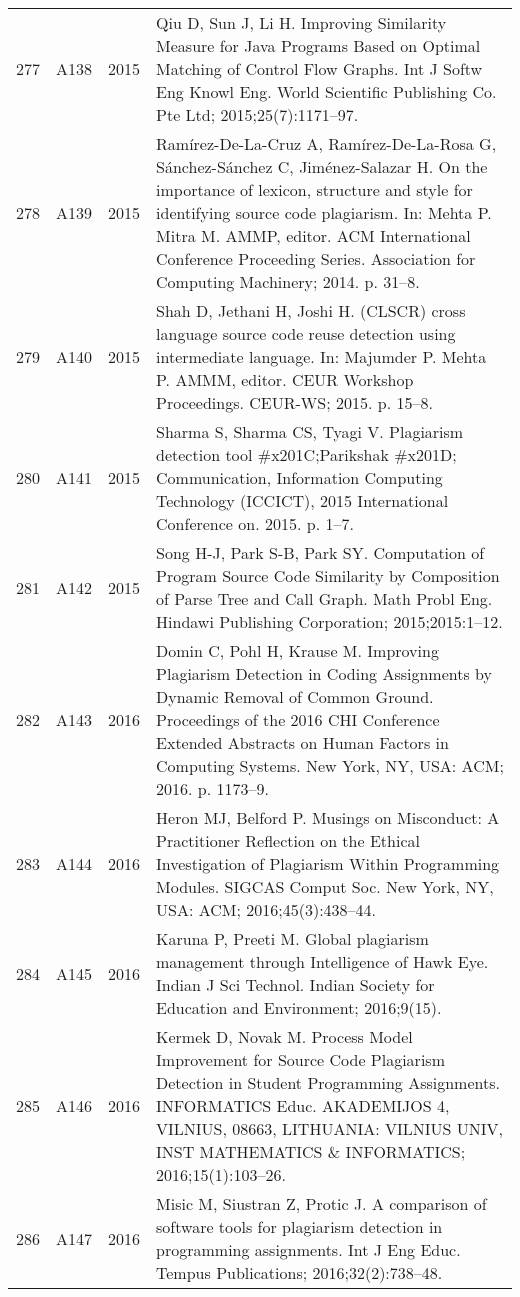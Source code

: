 \documentclass{article}\usepackage[]{graphicx}\usepackage[]{color}
\begin{document}
\begin{longtable}{l|L{1cm}|L{1cm}|L{12cm}|}
  277 & A138 & 2015 & Qiu D, Sun J, Li H. Improving Similarity Measure for Java Programs Based on Optimal Matching of Control Flow Graphs. Int J Softw Eng Knowl Eng. World Scientific Publishing Co. Pte Ltd; 2015;25(7):1171–97. \\ 
  278 & A139 & 2015 & Ramírez-De-La-Cruz A, Ramírez-De-La-Rosa G, Sánchez-Sánchez C, Jiménez-Salazar H. On the importance of lexicon, structure and style for identifying source code plagiarism. In: Mehta P. Mitra M. AMMP, editor. ACM International Conference Proceeding Series. Association for Computing Machinery; 2014. p. 31–8. \\ 
  279 & A140 & 2015 & Shah D, Jethani H, Joshi H. (CLSCR) cross language source code reuse detection using intermediate language. In: Majumder P. Mehta P. AMMM, editor. CEUR Workshop Proceedings. CEUR-WS; 2015. p. 15–8. \\ 
  280 & A141 & 2015 & Sharma S, Sharma CS, Tyagi V. Plagiarism detection tool \#x201C;Parikshak \#x201D; Communication, Information Computing Technology (ICCICT), 2015 International Conference on. 2015. p. 1–7. \\ 
  281 & A142 & 2015 & Song H-J, Park S-B, Park SY. Computation of Program Source Code Similarity by Composition of Parse Tree and Call Graph. Math Probl Eng. Hindawi Publishing Corporation; 2015;2015:1–12. \\ 
  282 & A143 & 2016 & Domin C, Pohl H, Krause M. Improving Plagiarism Detection in Coding Assignments by Dynamic Removal of Common Ground. Proceedings of the 2016 CHI Conference Extended Abstracts on Human Factors in Computing Systems. New York, NY, USA: ACM; 2016. p. 1173–9. \\ 
  283 & A144 & 2016 & Heron MJ, Belford P. Musings on Misconduct: A Practitioner Reflection on the Ethical Investigation of Plagiarism Within Programming Modules. SIGCAS Comput Soc. New York, NY, USA: ACM; 2016;45(3):438–44. \\ 
  284 & A145 & 2016 & Karuna P, Preeti M. Global plagiarism management through Intelligence of Hawk Eye. Indian J Sci Technol. Indian Society for Education and Environment; 2016;9(15). \\ 
  285 & A146 & 2016 & Kermek D, Novak M. Process Model Improvement for Source Code Plagiarism Detection in Student Programming Assignments. INFORMATICS Educ. AKADEMIJOS 4, VILNIUS, 08663, LITHUANIA: VILNIUS UNIV, INST MATHEMATICS \& INFORMATICS; 2016;15(1):103–26. \\ 
  286 & A147 & 2016 & Misic M, Siustran Z, Protic J. A comparison of software tools for plagiarism detection in programming assignments. Int J Eng Educ. Tempus Publications; 2016;32(2):738–48. \\ 

\end{longtable}
\end{document}
